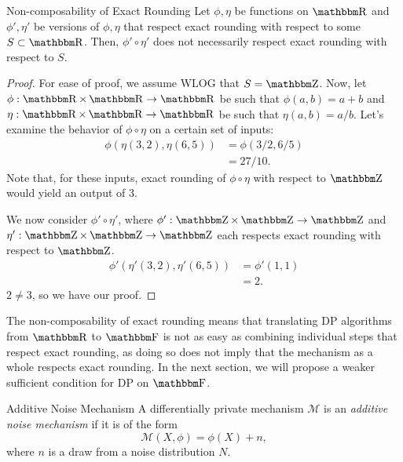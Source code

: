 \documentclass[11pt]{scrartcl} %
\begin{document}
\begin{theorem}
	\label{thm:non_composability_exact_rounding}
	Non-composability of Exact Rounding \newline
	Let $\phi, \eta$ be functions on $\R$ and $\phi', \eta'$ be versions of $\phi,\eta$
	that respect exact rounding with respect to some $S \subset \R$.
	Then, $\phi' \circ \eta'$ does not necessarily respect exact rounding with respect to $S$.

	\begin{proof}
		For ease of proof, we assume WLOG that $S = \Z$. Now, let $\phi: \R \times \R \rightarrow \R$ be such that
		$\phi(a,b) = a+b$ and $\eta: \R \times \R \rightarrow \R$ be such that $\eta(a,b) = a/b$.
		Let's examine the behavior of $\phi \circ \eta$ on a certain set of inputs:
		\begin{align*}
			\phi \left( \eta(3, 2), \eta(6, 5) \right) &= \phi \left( 3/2, 6/5 \right) \\
													   &= 27/10.
		\end{align*}
		Note that, for these inputs, exact rounding of $\phi \circ \eta$ with respect to $\Z$ would yield an output of $3$. \newline

		We now consider $\phi' \circ \eta'$, where $\phi': \Z \times \Z \rightarrow \Z$ and
		$\eta': \Z \times \Z \rightarrow \Z$ each respects exact rounding with respect to $\Z$.
		\begin{align*}
			\phi' \left( \eta'(3, 2), \eta'(6, 5) \right) &= \phi' \left( 1, 1 \right) \\
														  &= 2.
		\end{align*}
		$2 \neq 3$, so we have our proof.
	\end{proof}
\end{theorem}
The non-composability of exact rounding means that translating DP algorithms from $\R$ to $\F$
is not as easy as combining individual steps that respect exact rounding, as doing so
does not imply that the mechanism as a whole respects exact rounding.
In the next section, we will propose a weaker sufficient condition for DP on $\F$.

\begin{definition}
	\label{def:additive_noise_mechanism}
	Additive Noise Mechanism \newline
	A differentially private mechanism $\mathcal{M}$ is an \emph{additive noise mechanism}
	if it is of the form
	\[ \mathcal{M}(X, \phi) = \phi(X) + n, \]
	where $n$ is a draw from a noise distribution $N$.
\end{definition}
\end{document}
